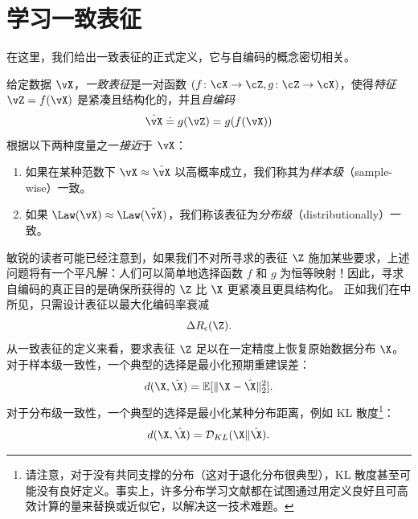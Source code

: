 \documentclass[../../book-main_zh.tex]{subfiles}
\begin{document}
\section{学习一致表征}\label{sec:consistent-representation}

在这里，我们给出一致表征的正式定义，它与自编码的概念密切相关。 %
\begin{definition}[一致表征]\label{def:bidirectional_rep}
    给定数据 \(\vX\)，\textit{一致表征}是一对函数 \((f \colon \cX \to \cZ, g \colon \cZ \to \cX)\)，使得\textit{特征} \(\vZ = f(\vX)\) 是紧凑且结构化的，并且\textit{自编码}
    \begin{equation}
        \hat{\vX} \doteq g(\vZ) = g(f(\vX))
    \end{equation}
    根据以下两种度量之一\textit{接近}于 \(\vX\)：
    \begin{enumerate}
        \item 如果在某种范数下 \(\vX \approx \hat{\vX}\) 以高概率成立，我们称其为\textit{样本级}（sample-wise）一致。
        \item 如果 \(\Law(\vX) \approx \Law(\hat{\vX})\)，我们称该表征为\textit{分布级}（distributionally）一致。
    \end{enumerate}
\end{definition}

敏锐的读者可能已经注意到，如果我们不对所寻求的表征 $\Z$ 施加某些要求，上述问题将有一个平凡解：人们可以简单地选择函数 $f$ 和 $g$ 为恒等映射！因此，寻求自编码的真正目的是确保所获得的 $\Z$ 比 $\X$ 更紧凑且更具结构化。
正如我们在中所见，只需设计表征以最大化编码率衰减
\begin{equation}
    \Delta R_{\epsilon}(\Z).
\end{equation}%
从一致表征的定义来看，要求表征 $\Z$ 足以在一定精度上恢复原始数据分布 $\X$。对于样本级一致性，一个典型的选择是最小化预期重建误差：
\begin{equation}
    d(\X, \hat \X) = \mathbb{E}[\|\X - \hat\X\|_2^2].
\end{equation}
对于分布级一致性，一个典型的选择是最小化某种分布距离，例如 KL 散度\footnote{请注意，对于没有共同支撑的分布（这对于退化分布很典型），KL 散度甚至可能没有良好定义。事实上，许多分布学习文献都在试图通过用定义良好且可高效计算的量来替换或近似它，以解决这一技术难题。}：
\begin{equation}
    d(\X, \hat \X) = \mathcal{D}_{KL}(\X\|\hat\X).
\end{equation}
\end{document}
